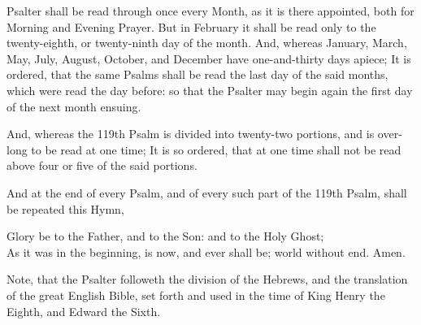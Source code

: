 
\noindent
{} Psalter shall be read through once every Month, as it is there appointed, both for Morning and Evening Prayer. But in February it shall be read only to the twenty-eighth, or twenty-ninth day of the month.
And, whereas January, March, May, July, August, October, and December have one-and-thirty days apiece; It is ordered, that the same Psalms shall be read the last day of the said months, which were read the day before: so that the Psalter may begin again the first day of the next month ensuing.

And, whereas the 119th Psalm is divided into twenty-two portions, and is over-long to be read at one time; It is so ordered, that at one time shall not be read above four or five of the said portions.

And at the end of every Psalm, and of every such part of the 119th Psalm, shall be repeated this Hymn,

\begin{quoting}\noindent
Glory be to the Father, and to the Son: and to the Holy Ghost;\\
As it was in the beginning, is now, and ever shall be; world without end. Amen.
\end{quoting}

Note, that the Psalter followeth the division of the Hebrews, and the translation of the great English Bible, set forth and used in the time of King Henry the Eighth, and Edward the Sixth.

\clearpage
